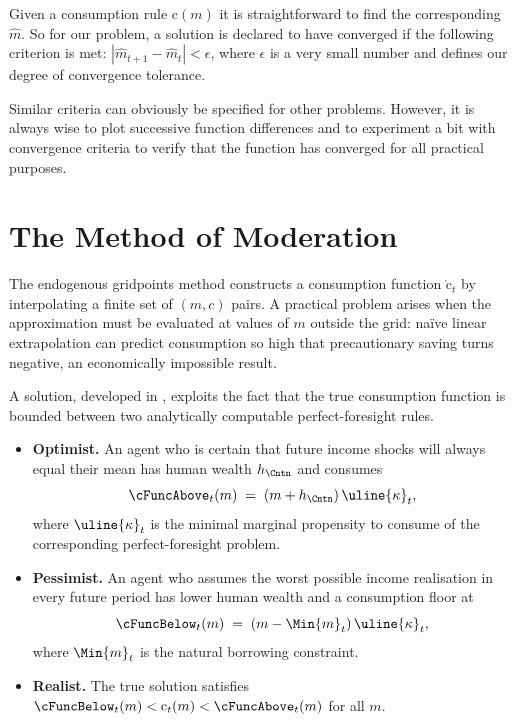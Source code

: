\documentclass[titlepage, headings=optiontotocandhead]{econark}
\begin{document}
{Given a consumption rule $\mathrm{c}(m)$ it is straightforward to find
the corresponding $\hat{m}$.  So for our problem, a solution is declared
to have converged if the following criterion is met:
$\left|\hat{m}_{t+1}-\hat{m}_{t}\right| < \epsilon$, where $\epsilon$ is
a very small number and defines our degree of convergence tolerance.

Similar criteria can obviously be specified for other problems.
However, it is always wise to plot successive function differences and
to experiment a bit with convergence criteria to verify that the
function has converged for all practical purposes.



}
\hypertarget{method-of-moderation}{}
\section{The Method of Moderation}\label{sec:method-of-moderation}

The endogenous gridpoints method constructs a consumption function
$\grave{\mathrm{c}}_{t}$ by interpolating a finite set of
$(m,c)$ pairs.  A practical problem arises when the
approximation must be evaluated at values of $m$ outside the
grid: na\"ive linear extrapolation can predict consumption so high
that precautionary saving turns negative, an economically impossible
result.

A solution, developed in \cite{method-of-moderation}, exploits the fact that the
true consumption function is bounded between two analytically
computable perfect-foresight rules.
\begin{itemize}
  \item \textbf{Optimist.} An agent who is certain that future income
  shocks will always equal their mean has human wealth
  $h_{\Cntn}$ and consumes
  \begin{equation}
    \cFuncAbove_{t}(m) \;=\;
      (m + h_{\Cntn})\,{\uline{\kappa}}_{t},
      \label{eq:cFuncAboveBrief}
  \end{equation}
  where ${\uline{\kappa}}_{t}$ is the minimal marginal propensity to
  consume of the corresponding perfect-foresight problem.
  \item \textbf{Pessimist.} An agent who assumes the worst possible
  income realisation in every future period has lower human wealth and
  a consumption floor at
  \begin{equation}
    \cFuncBelow_{t}(m) \;=\;
      (m - \Min{m}_{t})\,{\uline{\kappa}}_{t},
      \label{eq:cFuncBelowBrief}
  \end{equation}
  where $\Min{m}_{t}$ is the natural borrowing constraint.
  \item \textbf{Realist.}  The true solution satisfies
  $\cFuncBelow_{t}(m) < \mathrm{c}_{t}(m) <
  \cFuncAbove_{t}(m)$ for all $m$.
\end{itemize}
\end{document}

